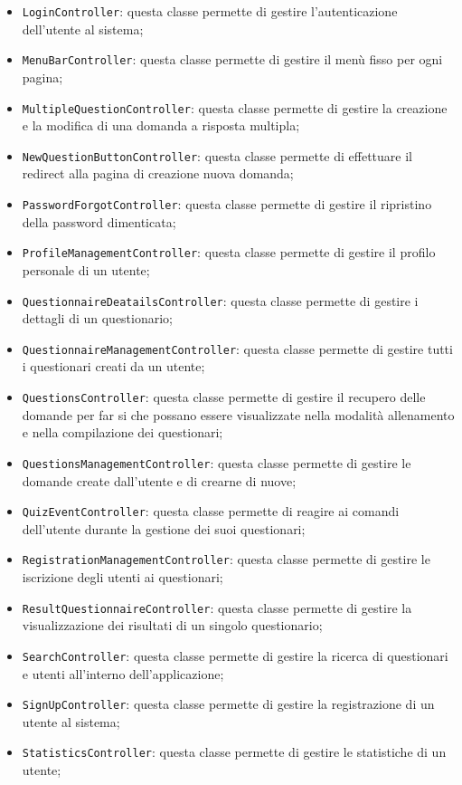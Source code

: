 \begin{itemize}
\begin{itemize}
		\item \texttt{LoginController}: questa classe permette di gestire l'autenticazione dell'utente al sistema;
		\item \texttt{MenuBarController}: questa classe permette di gestire il menù fisso per ogni pagina;
		\item \texttt{MultipleQuestionController}: questa classe permette di gestire la creazione e la modifica di una domanda a risposta multipla;
		\item \texttt{NewQuestionButtonController}: questa classe permette di effettuare il redirect alla pagina di creazione nuova domanda;
		\item \texttt{PasswordForgotController}: questa classe permette di gestire il ripristino della password dimenticata;
		\item \texttt{ProfileManagementController}: questa classe permette di gestire il profilo personale di un utente;
		\item \texttt{QuestionnaireDeatailsController}: questa classe permette di gestire i dettagli di un questionario;
		\item \texttt{QuestionnaireManagementController}: questa classe permette di gestire tutti i questionari creati da un utente;
		\item \texttt{QuestionsController}: questa classe permette di gestire il recupero delle domande per far si che possano essere visualizzate nella modalità allenamento e nella compilazione dei questionari;
		\item \texttt{QuestionsManagementController}: questa classe permette di gestire le domande create dall'utente e di crearne di nuove;
		\item \texttt{QuizEventController}: questa classe permette di reagire ai comandi dell'utente durante la gestione dei suoi questionari;
		\item \texttt{RegistrationManagementController}: questa classe permette di gestire le iscrizione degli utenti ai questionari;
		\item \texttt{ResultQuestionnaireController}: questa classe permette di gestire la visualizzazione dei risultati di un singolo questionario;
		\item \texttt{SearchController}: questa classe permette di gestire la ricerca di questionari e utenti all'interno dell'applicazione;
		\item \texttt{SignUpController}: questa classe permette di gestire la registrazione di un utente al sistema;
		\item \texttt{StatisticsController}: questa classe permette di gestire le statistiche di un utente;

\end{itemize}
\end{itemize}
